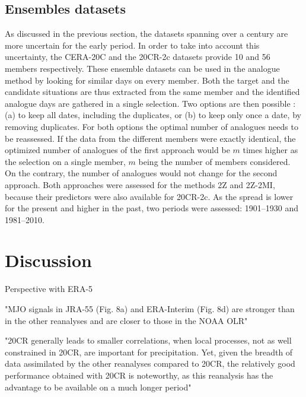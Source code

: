 \documentclass{ametsoc}
\begin{document}
\subsection{Ensembles datasets}
\label{sec:ensemble}

As discussed in the previous section, the datasets spanning over a century are more uncertain for the early period. In order to take into account this uncertainty, the CERA-20C and the 20CR-2c datasets provide 10 and 56 members respectively. These ensemble datasets can be used in the analogue method by looking for similar days on every member. Both the target and the candidate situations are thus extracted from the same member and the identified analogue days are gathered in a single selection. Two options are then possible : (a) to keep all dates, including the duplicates, or (b) to keep only once a date, by removing duplicates. For both options the optimal number of analogues needs to be reassessed. If the data from the different members were exactly identical, the optimized number of analogues of the first approach would be $m$ times higher as the selection on a single member, $m$ being the number of members considered. On the contrary, the number of analogues would not change for the second approach. Both approaches were assessed for the methods 2Z and 2Z-2MI, because their predictors were also available for 20CR-2c. As the spread is lower for the present and higher in the past, two periods were assessed: 1901--1930 and 1981--2010.










\section{Discussion}



Perspective with ERA-5


"MJO signals in JRA-55 (Fig. 8a) and ERA-Interim (Fig. 8d) are stronger than in the other reanalyses and are closer to those in the NOAA OLR" \cite{Harada2016}



"20CR generally leads to smaller correlations, when local processes, not as well constrained in 20CR, are important for precipitation. Yet, given the breadth of data assimilated by the other reanalyses compared to 20CR, the relatively good performance obtained with 20CR is noteworthy, as this reanalysis has the advantage to be available on a much longer period" \cite{Dayon2015}
\end{document}
